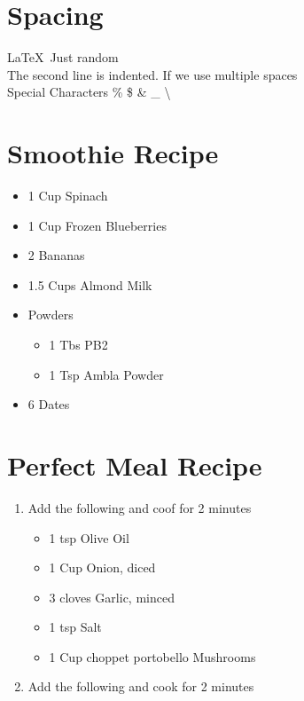 \documentclass[a4paper,12pt,]{report}
\begin{document}
\endgroup

\section*{Spacing}
\LaTeX\
Just random \\
The second line is indented. If we   use    multiple spaces
\\[10pt]



Special Characters
\% \$ \& \_ \textbackslash


\section[Smoothie]{Smoothie Recipe}
\begin{itemize}
\item 1 Cup Spinach
\item 1 Cup Frozen Blueberries
\item 2 Bananas
\item 1.5 Cups Almond Milk
\item Powders
\begin{itemize}
\item 1 Tbs PB2
\item 1 Tsp Ambla Powder
\end{itemize}
\item 6 Dates
\end{itemize}




\section{Perfect Meal Recipe}
\begin{enumerate}[label=\Roman*,font=\bfseries]
\item Add the following and coof for 2 minutes
\begin{itemize}
\item 1 tsp Olive Oil
\item 1 Cup Onion, diced
\item 3 cloves Garlic, minced
\item 1 tsp Salt
\item 1 Cup choppet portobello Mushrooms
\end{itemize}
\item Add the following and cook for 2 minutes
\end{enumerate}
\end{document}
